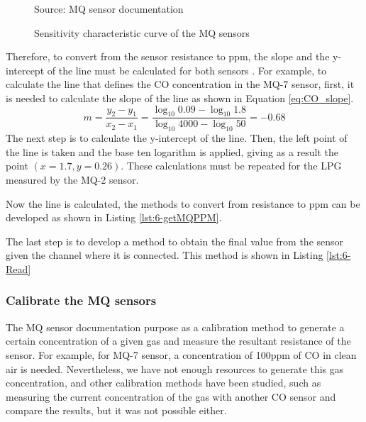 \begin{figure}[htb]
	\centering
	\caption{Sensitivity characteristic curve of the MQ sensors}
	\label{fig:6-MQ_curve}{Source: MQ sensor documentation \cite{MQ7,MQ2}}
\end{figure}

Therefore, to convert from the sensor resistance to ppm, the slope and the y-intercept of the line must be calculated for both sensors \cite{ConfMQX}. For example, to calculate the line that defines the CO concentration in the MQ-7 sensor, first, it is needed to calculate the slope of the line as shown in Equation \ref{eq:CO_slope}.
\begin{equation} \label{eq:CO_slope}
m=\frac { { y }_{ 2 }-{ y }_{ 1 } }{ { x }_{ 2 }-{ x }_{ 1 } } =\frac { \log _{ 10 }{ 0.09 } -\log _{ 10 }{ 1.8 }  }{ \log _{ 10 }{ 4000 } -\log _{ 10 }{ 50 }  } =-0.68
\end{equation}
The next step is to calculate the y-intercept of the line. Then, the left point of the line is taken and the base ten logarithm is applied, giving as a result the point $(x=1.7, y=0.26)$. These calculations must be repeated for the LPG measured by the MQ-2 sensor.

Now the line is calculated, the methods to convert from resistance to ppm can be developed as shown in Listing \ref{lst:6-getMQPPM}.



The last step is to develop a method to obtain the final value from the sensor given the channel where it is connected. This method is shown in Listing \ref{lst:6-Read}




\subsubsection{Calibrate the MQ sensors}
The MQ sensor documentation purpose as a calibration method to generate a certain concentration of a given gas and measure the resultant resistance of the sensor. For example, for MQ-7 sensor, a concentration of 100ppm of CO in clean air is needed. Nevertheless, we have not enough resources to generate this gas concentration, and other calibration methods have been studied, such as measuring the current concentration of the gas with another CO sensor and compare the results, but it was not possible either. 

